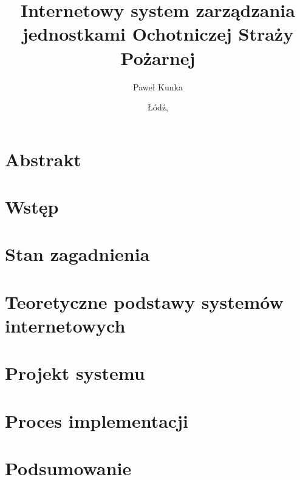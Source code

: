 \documentclass[a4paper,12pt,polish,twoside]{extreport}
\title{Internetowy system zarządzania jednostkami Ochotniczej Straży Pożarnej}
\author{Paweł Kunka}
\date{\L{}\'od\'z, \mydate}
\begin{document}



\thispagestyle{plain}
\null\newpage

\chapter*{Abstrakt}


%

%

\tableofcontents
{}
\null\newpage

\chapter{Wstęp}


\chapter{Stan zagadnienia}


\chapter{Teoretyczne podstawy systemów internetowych}


\chapter{Projekt systemu}


\chapter{Proces implementacji}


\chapter{Podsumowanie}


%

\newpage
\listoffigures

\newpage
\listoftables

\newpage
{}
\lstlistoflistings

\printbibliography[heading=bibintoc]
\end{document}

